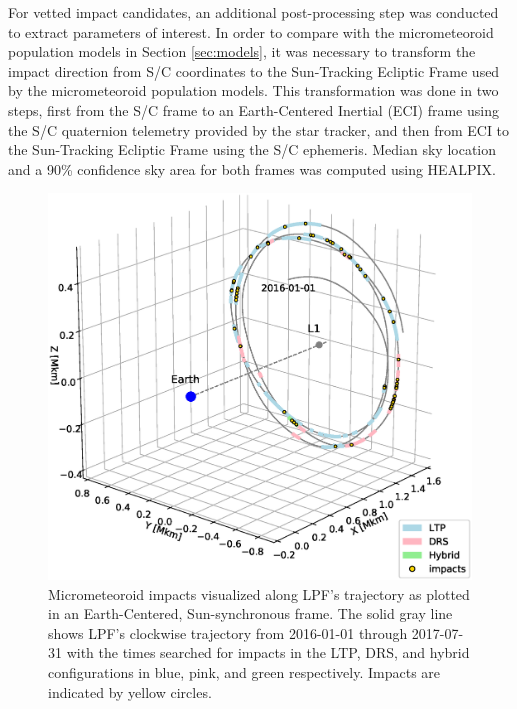 \documentclass[twocolumn, trackchanges]{aastex62}
\begin{document}
For vetted impact candidates, an additional post-processing step was conducted to extract parameters of interest.  In order to compare with the micrometeoroid population models in Section \ref{sec:models}, it was necessary to transform the impact direction from S/C coordinates to the Sun-Tracking Ecliptic Frame used by the micrometeoroid population models.  This transformation was done in two steps, first from the S/C frame to an Earth-Centered Inertial (ECI) frame using the S/C quaternion telemetry provided by the star tracker, and then from ECI to the Sun-Tracking Ecliptic Frame using the S/C ephemeris. Median sky location and a 90\% confidence sky area for both frames was computed using HEALPIX\citep{HEALPIX}. 

\begin{figure}[t]
\includegraphics[width=\columnwidth]{figures/ephemeris.eps} 
\caption{Micrometeoroid impacts visualized along LPF's trajectory as plotted in an Earth-Centered, Sun-synchronous frame.  The solid gray line shows LPF's clockwise trajectory from 2016-01-01 through 2017-07-31 with the times searched for impacts in the LTP, DRS, and hybrid configurations in blue, pink, and green respectively. Impacts are indicated by yellow circles. \label{fig:ephemeris}}
\end{figure}
\end{document}

